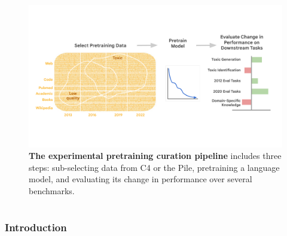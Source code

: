 \documentclass{article}
\begin{document}
\vspace{1em}

\begin{figure}[ht]
    \centering
    \includegraphics[width=0.99 \linewidth]{fables/slice_ablations_intro.pdf}
    \caption{
    \small \textbf{The experimental pretraining curation pipeline} includes three steps: sub-selecting data from C4 or the Pile, pretraining a language model, and evaluating its change in performance over several benchmarks.}
    \vspace{-3mm}
    \label{fig:intro}
\end{figure}
\thispagestyle{empty}
\newpage


\doparttoc %
\faketableofcontents %
\noptcrule 
\tightmtctrue
\renewcommand{\ptctitle}{Contents}
\part{} %
\parttoc{} %
\thispagestyle{empty}

\newpage


\vspace{-1mm}
\section{Introduction}
\vspace{-3mm}
\end{document}
